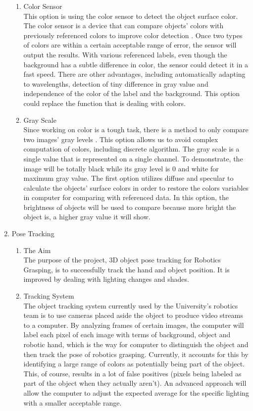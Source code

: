 \documentclass[10pt,journal,compsoc, draftclsnofoot,onecolumn]{IEEEtran}
\begin{document}
\begin{enumerate}
\begin{enumerate}
    \item Color Sensor \\
    This option is using the color sensor to detect the object surface color. The color sensor is a device that can compare objects' colors with previously referenced colors to improve color detection \cite{104:online}. Once two types of colors are within a certain acceptable range of error, the sensor will output the results. With various referenced labels, even though the background has a subtle difference in color, the sensor could detect it in a fast speed. There are other advantages, including automatically adapting to wavelengths, detection of tiny difference in gray value and independence of the color of the label and the background. This option could replace the function that is dealing with colors. 
    \item Gray Scale \\
    Since working on color is a tough task, there is a method to only compare two images' gray levels \cite{105:online}. This option allows us to avoid complex computation of colors, including discrete algorithm. The gray scale is a single value that is represented on a single channel. To demonstrate, the image will be totally black while its gray level is 0 and white for maximum gray value. The first option utilizes diffuse and specular to calculate the objects' surface colors in order to restore the colors variables in computer for comparing with referenced data. In this option, the brightness of objects will be used to compare because more bright the object is, a higher gray value it will show. 
    \end{enumerate}
\item Pose Tracking
    \begin{enumerate}
    \item The Aim \\
    The purpose of the project, 3D object pose tracking for Robotics Grasping, is to successfully track the hand and object position. It is improved by dealing with lighting changes and shades. 
    \item Tracking System \\
    The object tracking system currently used by the University's robotics team is to use cameras placed aside the object to produce video streams to a computer. By analyzing frames of certain images, the computer will label each pixel of each image with terms of background, object and robotic hand, which is the way for computer to distinguish the object and then track the pose of robotics grasping. Currently, it accounts for this by identifying a large range of colors as potentially being part of the object. This, of course, results in a lot of false positives (pixels being labeled as part of the object when they actually aren't). An advanced approach will allow the computer to adjust the expected average for the specific lighting with a smaller acceptable range. 

\end{enumerate}
\end{enumerate}
\end{document}
